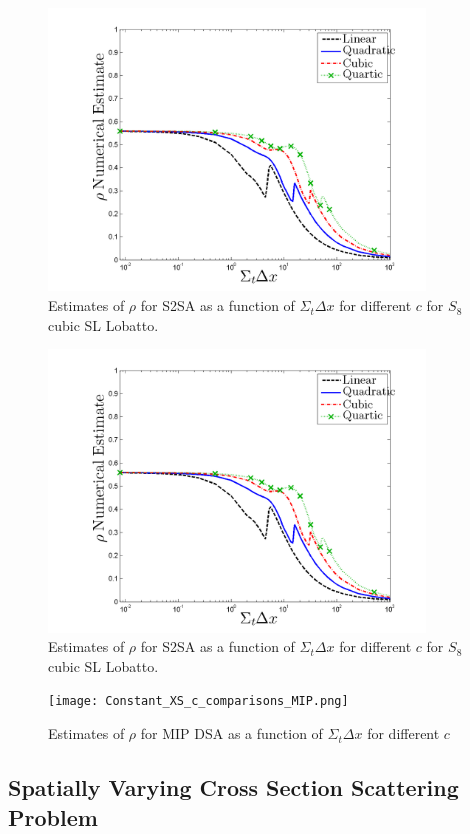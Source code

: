 \begin{figure}[!htp]
\centering
\includegraphics[width=10cm]{Constant_XS_SN8_MIP_Gauss.png}
\caption{Estimates of $\rho$ for S2SA as a function of $\Sigma_t \Delta x$ for different $c$  for $S_8$ cubic SL Lobatto.}
\label{fig:mip_gauss}
\end{figure}

\begin{figure}[!hbp]
\centering
\includegraphics[width=10cm]{Constant_XS_SN8_MIP_Gauss.png}
\caption{Estimates of $\rho$ for S2SA as a function of $\Sigma_t \Delta x$ for different $c$  for $S_8$ cubic SL Lobatto.}
\label{fig:mip_gauss}
\end{figure}

\begin{figure}[!hbp]
\centering
\texttt{[image: Constant\_XS\_c\_comparisons\_MIP.png]}
\caption{Estimates of $\rho$ for MIP DSA as a function of $\Sigma_t \Delta x$ for different $c$}
\label{fig:mip_as_fun_c}
\end{figure}

\subsection{Spatially Varying Cross Section Scattering Problem}
\label{sec:chap4_variable_xs}



